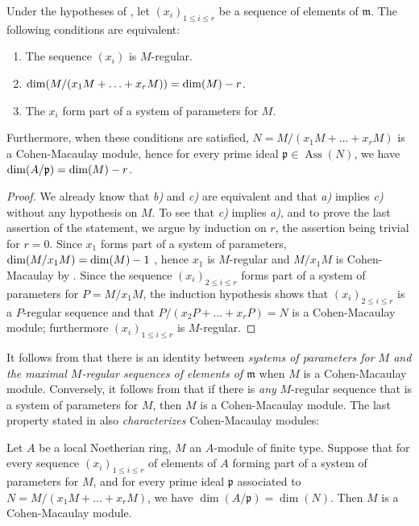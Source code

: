 \begin{corollary}[16.5.6]
\label{0.16.5.6}
Under the hypotheses of , let $(x_i)_{1\leq i\leq r}$ be a sequence of elements of $\mathfrak{m}$.
The following conditions are equivalent:
\begin{enumerate}
  \item[\textup{a)}] The sequence $(x_i)$ is $M$-regular.
  \item[\textup{b)}] $\dim(M/(x_1M+\ldots+x_r M))=\dim(M)- r$.
  \item[\textup{c)}] The $x_i$ form part of a system of parameters for $M$.
\end{enumerate}
Furthermore, when these conditions are satisfied, $N=M/(x_1M+\ldots+x_r M)$ is a Cohen-Macaulay module, hence for every prime ideal $\mathfrak{p}\in\operatorname{Ass}(N)$, we have $\dim(A/\mathfrak{p})=\dim(M)- r$.
\end{corollary}

\begin{proof}
We already know that \emph{b)} and \emph{c)} are equivalent  and that \emph{a)} implies \emph{c)}  without any hypothesis on $M$. To see that \emph{c)} implies \emph{a)}, and to prove the last assertion of the statement, we argue by induction on $r$, the assertion being trivial for $r=0$.
Since $x_1$ forms part of a system of parameters, $\dim(M/x_1M)=\dim(M)- 1$ , hence $x_1$ is $M$-regular and $M/x_1M$ is Cohen-Macaulay by .
Since the sequence $(x_i)_{2\leq i\leq r}$ forms part of a system of parameters for $P=M/x_1M$, the induction hypothesis shows that $(x_i)_{2\leq i\leq r}$ is a $P$-regular sequence and that $P/(x_2P+\ldots+x_r P)=N$ is a Cohen-Macaulay module; furthermore $(x_i)_{1\leq i\leq r}$ is $M$-regular.
\end{proof}

\begin{remark}[16.5.7]
\label{0.16.5.7}
It follows from  that there is an identity between \emph{systems of parameters for $M$ and the maximal $M$-regular sequences of elements of $\mathfrak{m}$} when $M$ is a Cohen-Macaulay module.
Conversely, it follows from  that if there is \emph{any} $M$-regular sequence that is a system of parameters for $M$, then $M$ is a Cohen-Macaulay module.
The last property stated in  also \emph{characterizes} Cohen-Macaulay modules:
\end{remark}

\begin{proposition}[16.5.8]
\label{0.16.5.8}
Let $A$ be a local Noetherian ring, $M$ an $A$-module of finite type.
Suppose that for every sequence $(x_i)_{1\leq i\leq r}$ of elements of $A$ forming part of a system of parameters for $M$, and for every prime ideal $\mathfrak{p}$ associated to $N=M/(x_1M+\ldots+x_r M)$, we have $\dim(A/\mathfrak{p})=\dim(N)$.
Then $M$ is a Cohen-Macaulay module.
\end{proposition}

